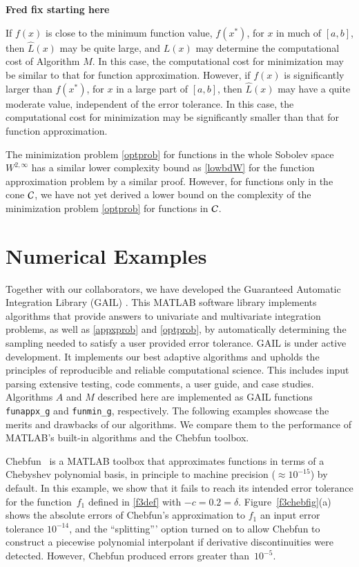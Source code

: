 \documentclass[review]{elsarticle}
\theoremstyle{definition}
\renewcommand{\cw}{W}
\newcommand{\chL}{\widehat{L}}
\newtheorem{exmp}{Example}
\newcommand{\funappxg}{\texttt{funappx\_g}\xspace}
\newcommand{\funming}{\texttt{funmin\_g}\xspace}
\begin{document}
\textbf{Fred fix starting here}

If $f(x)$ is close to the minimum function value, $f(x^*)$, for $x$ in much of
$[a,b]$, then $\chL(x)$ may be quite large, and $L(x)$ may determine the
computational cost of Algorithm $M$. In this case, the computational cost for
minimization may be similar to that for function approximation. However, if
$f(x)$ is significantly larger than $f(x^*)$, for $x$ in a large part of
$[a,b]$, then $\chL(x)$ may have a quite moderate value, independent of the
error tolerance. In this case, the computational cost for minimization may be
significantly smaller than that for function approximation.


The minimization problem \eqref{optprob} for functions in the whole Sobolev
space $\cw^{2,\infty}$ has a similar lower complexity bound as \eqref{lowbdW}
for the function approximation problem by a similar proof. However, for
functions only in the cone $\mathcal{C}$, we have not yet derived a lower bound on the
complexity of the minimization problem \eqref{optprob} for functions in $\mathcal{C}$.

\section{Numerical Examples} \label{sec:examples}

Together with our collaborators, we have developed the Guaranteed Automatic
Integration Library (GAIL) \cite{ChoEtal15a}. This MATLAB software library
implements algorithms that provide answers to univariate and multivariate
integration problems, as well as \eqref{appxprob} and \eqref{optprob}, by
automatically determining the sampling needed to satisfy a user provided error
tolerance. GAIL is under active development. It implements our best adaptive
algorithms and upholds the principles of reproducible and reliable computational
science. This includes input parsing extensive testing, code comments, a user
guide, and case studies. Algorithms $A$ and $M$ described here are implemented
as GAIL functions \funappxg{} and \funming, respectively. The following examples
showcase the merits and drawbacks of our algorithms. We compare them to the
performance of MATLAB's built-in algorithms and the Chebfun toolbox.

Chebfun~\cite{TrefEtal16a} is a MATLAB toolbox that approximates functions in
terms of a Chebyshev polynomial basis, in principle to machine precision
($\approx 10^{-15}$) by default. In this example, we show that it fails to reach
its intended error tolerance for the function~$f_1$ defined in \eqref{f3def} 
with $-c = 0.2 = \delta$.
Figure~\ref{f3chebfig}(a) shows the absolute errors of Chebfun's approximation to
$f_1$  an input error tolerance $10^{-14}$, and the ``splitting''' option  turned on to allow
Chebfun to construct a piecewise polynomial interpolant if derivative
discontinuities were detected.  However, Chebfun produced errors greater 
than~$10^{-5}$.
\end{document}
